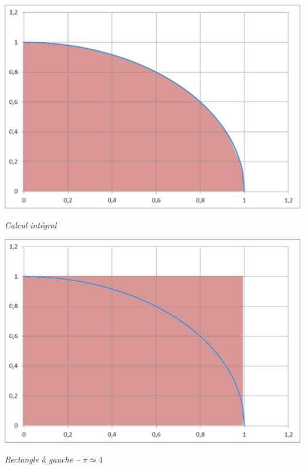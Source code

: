 \documentclass[11pt]{article}
\begin{document}
\begin{minipage}[c]{.24\linewidth}
\begin{center}
\includegraphics[width=.99\textwidth]{images/pi}

\textit{Calcul intégral}
\end{center}
\end{minipage}\hfill
\begin{minipage}[c]{.24\linewidth}
\begin{center}
\includegraphics[width=.99\textwidth]{images/pi_1_g}

\textit{Rectangle à gauche -- $\pi \simeq 4$  }
\end{center}
\end{minipage}\hfill
\end{document}
